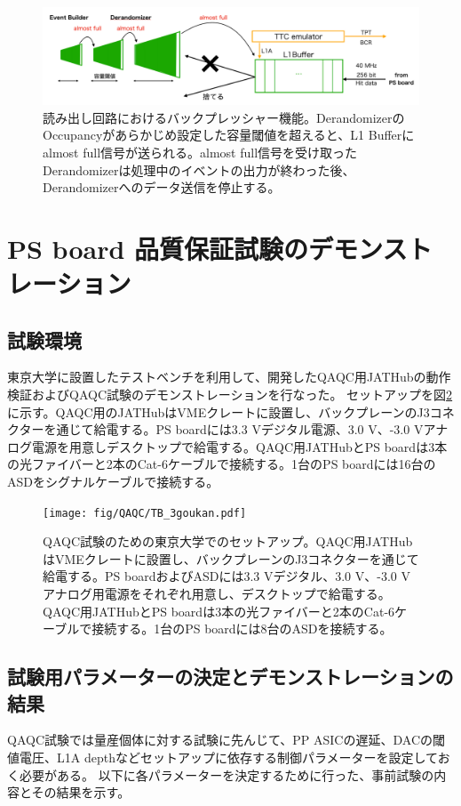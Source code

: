 \begin{figure} 
\centering
\includegraphics[width=16cm]{fig/QAQC/JATHubbackpressure.png}
\caption[リードアウト回路におけるバックプレッシャー機能]{読み出し回路におけるバックプレッシャー機能。DerandomizerのOccupancyがあらかじめ設定した容量閾値を超えると、L1 Bufferにalmost full信号が送られる。almost full信号を受け取ったDerandomizerは処理中のイベントの出力が終わった後、Derandomizerへのデータ送信を停止する。}
\label{JATHubbackpressure}
\end{figure}


\clearpage
\section{PS board 品質保証試験のデモンストレーション}
\label{sec_PSboardQAQCdemo}

\subsection{試験環境}
\label{subsec_testenv}
東京大学に設置したテストベンチを利用して、開発したQAQC用JATHubの動作検証およびQAQC試験のデモンストレーションを行なった。
セットアップを図\ref{QAQCsetup}に示す。QAQC用のJATHubはVMEクレートに設置し、バックプレーンのJ3コネクターを通じて給電する。PS boardには3.3 Vデジタル電源、3.0 V、-3.0 Vアナログ電源を用意しデスクトップで給電する。QAQC用JATHubとPS boardは3本の光ファイバーと2本のCat-6ケーブルで接続する。1台のPS boardには16台のASDをシグナルケーブルで接続する。

\begin{figure} 
\centering
\texttt{[image: fig/QAQC/TB\_3goukan.pdf]}
\caption[]{QAQC試験のための東京大学でのセットアップ。QAQC用JATHubはVMEクレートに設置し、バックプレーンのJ3コネクターを通じて給電する。PS boardおよびASDには3.3 Vデジタル、3.0 V、-3.0 Vアナログ用電源をそれぞれ用意し、デスクトップで給電する。QAQC用JATHubとPS boardは3本の光ファイバーと2本のCat-6ケーブルで接続する。1台のPS boardには8台のASDを接続する。}
\label{QAQCsetup}
\end{figure}


\subsection{試験用パラメーターの決定とデモンストレーションの結果}
\label{subsec_tb_result}
QAQC試験では量産個体に対する試験に先んじて、PP ASICの遅延、DACの閾値電圧、L1A depthなどセットアップに依存する制御パラメーターを設定しておく必要がある。
以下に各パラメーターを決定するために行った、事前試験の内容とその結果を示す。

